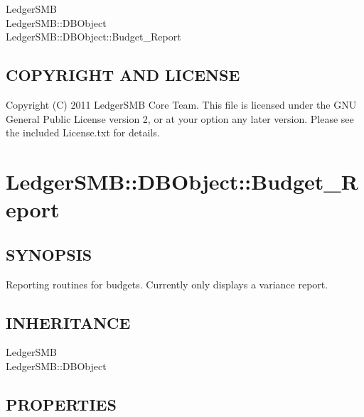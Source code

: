 \begin{description}
\begin{description}
\item[{LedgerSMB}] \mbox{}
\item[{LedgerSMB::DBObject}] \mbox{}
\item[{LedgerSMB::DBObject::Budget\_Report}] \mbox{}\end{description}
\subsection*{COPYRIGHT AND LICENSE\label{LedgerSMB::DBObject::Budget_COPYRIGHT_AND_LICENSE}}


Copyright (C) 2011 LedgerSMB Core Team.  This file is licensed under the GNU 
General Public License version 2, or at your option any later version.  Please
see the included License.txt for details.

\section{LedgerSMB::DBObject::Budget\_Report\label{LedgerSMB::DBObject::Budget_Report}}




\subsection*{SYNOPSIS\label{LedgerSMB::DBObject::Budget_Report_SYNOPSIS}}


Reporting routines for budgets.  Currently only displays a variance report.

\subsection*{INHERITANCE\label{LedgerSMB::DBObject::Budget_Report_INHERITANCE}}
\begin{description}

\item[{LedgerSMB}] \mbox{}
\item[{LedgerSMB::DBObject}] \mbox{}\end{description}
\subsection*{PROPERTIES\label{LedgerSMB::DBObject::Budget_Report_PROPERTIES}}
\begin{description}


\end{description}
\end{description}
